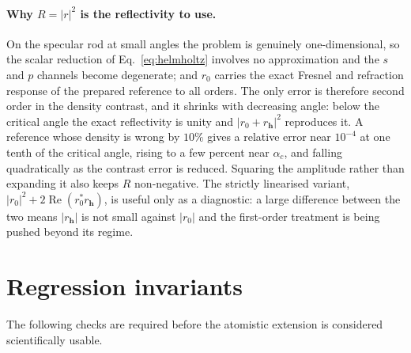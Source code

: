 \paragraph{Why $R=|r|^2$ is the reflectivity to use.}  On the specular rod at
small angles the problem is genuinely one-dimensional, so the scalar reduction
of Eq.~\eqref{eq:helmholtz} involves no approximation and the $s$ and $p$
channels become degenerate; and $r_0$ carries the exact Fresnel and refraction
response of the prepared reference to all orders.  The only error is therefore
second order in the density contrast, and it shrinks with decreasing angle:
below the critical angle the exact reflectivity is unity and $|r_0+r_{\bm h}|^2$
reproduces it.  A reference whose density is wrong by $10\%$ gives a relative
error near $10^{-4}$ at one tenth of the critical angle, rising to a few
percent near $\alpha_c$, and falling quadratically as the contrast error is
reduced.  Squaring the amplitude rather than expanding it also keeps $R$
non-negative.  The strictly linearised variant,
$|r_0|^2+2\operatorname{Re}(r_0^*r_{\bm h})$, is useful only as a diagnostic:
a large difference between the two means $|r_{\bm h}|$ is not small against
$|r_0|$ and the first-order treatment is being pushed beyond its regime.

\section{Regression invariants}

The following checks are required before the atomistic extension is considered
scientifically usable.

